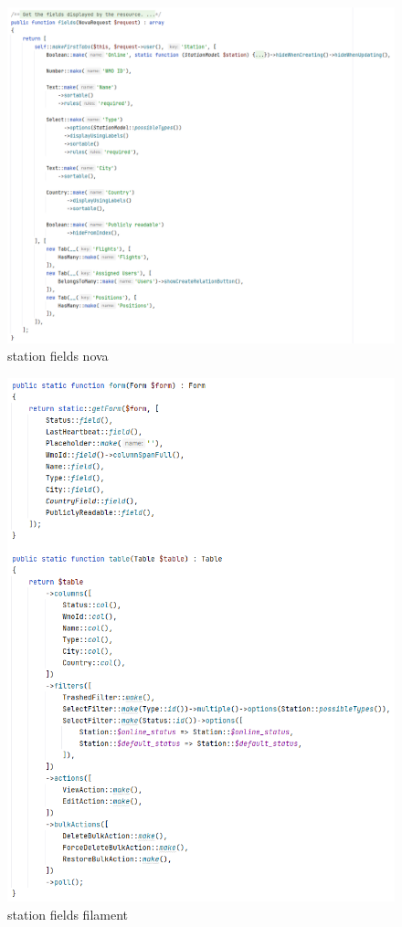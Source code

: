 \begin{figure}[h!]
    \centering
    \caption{station fields nova}
    \label{fig:station_fields_nova}
    \includegraphics[scale=0.25]{assets/station_fields_nova}
\end{figure}

\begin{figure}[h!]
    \centering
    \caption{station fields filament}
    \label{fig:station_fields_filament}
    \includegraphics[scale=0.25]{assets/station_fields_filament}
\end{figure}
